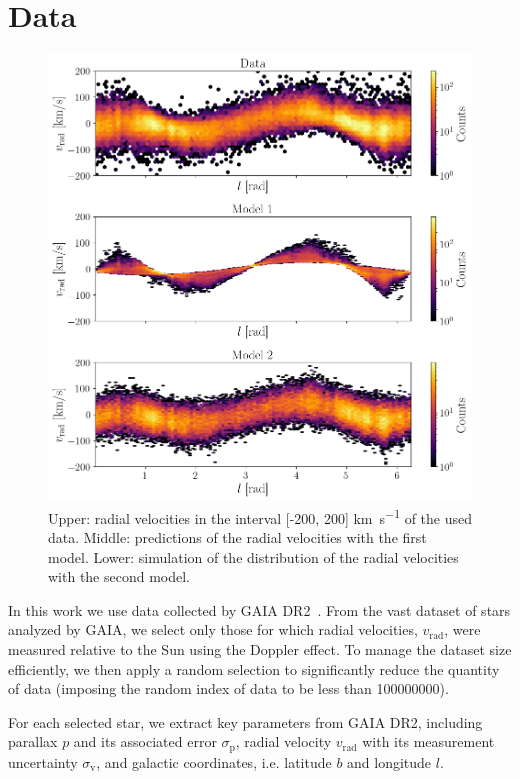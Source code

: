 \section{Data}

\begin{figure}[H]
    \centering
    \includegraphics[width=0.95\columnwidth]{Fig/DataModelPresentation.png}
    \caption{Upper: radial velocities in the interval [-200, 200] \unit{\kilo\meter\per\second} of the used data. Middle: predictions of the radial velocities with the first model. Lower: simulation of the distribution of the radial velocities with the second model.}
    \label{fig:DataModelPresentation}
\end{figure}

In this work we use data collected by GAIA DR2~\cite{GAIADR2}. 
From the vast dataset of stars analyzed by GAIA, we select only those 
for which radial velocities, $v_{\text{rad}}$, were measured relative to the Sun using the Doppler effect. 
To manage the dataset size efficiently, we then apply a random selection to significantly reduce the quantity of data 
(imposing the random index of data to be less than 100000000).

For each selected star, we extract key parameters from GAIA DR2, 
including parallax $p$ and its associated error $\sigma_{\text{p}}$, 
radial velocity $v_{\text{rad}}$ with its measurement uncertainty $\sigma_{\text{v}}$, 
and galactic coordinates, i.e. latitude $b$ and longitude $l$.

